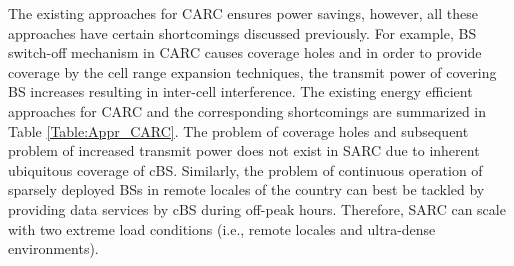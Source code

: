\documentclass[article,10pt,twocolumn]{IEEEtran}
\begin{document}
The existing approaches for CARC ensures power savings, however, all these approaches have certain shortcomings discussed previously. For example, BS switch-off mechanism in CARC causes coverage holes and in order to provide coverage by the cell range expansion techniques, the transmit power of covering BS increases resulting in inter-cell interference. The existing energy efficient approaches for CARC and the corresponding shortcomings are summarized in Table \ref{Table:Appr_CARC}. The problem of coverage holes and subsequent problem of increased transmit power does not exist in SARC due to inherent ubiquitous coverage of cBS. Similarly, the problem of continuous operation of sparsely deployed BSs in remote locales of the country can best be tackled by providing data services by cBS during off-peak hours. Therefore, SARC can scale with two extreme load conditions (i.e., remote locales and ultra-dense environments).
\end{document}
